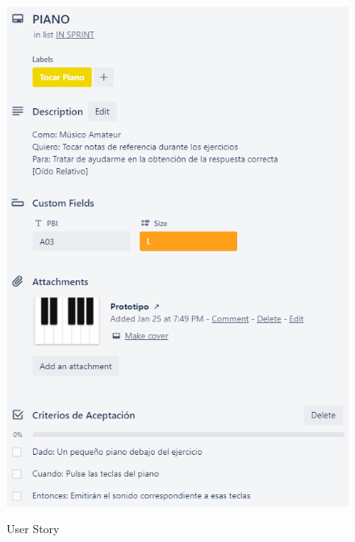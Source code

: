 \documentclass[12pt,twoside,titlepage]{report}
\begin{document}
{\begin{figure}[H]
    \centering
    \includegraphics[scale=1.3]{Scrum/User Stories/Piano}
    \label{fig:Piano}
    \caption{User Story}
\end{figure}

}
\end{document}
